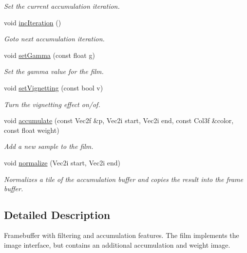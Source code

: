 \begin{DoxyCompactItemize}
\begin{DoxyCompactList}\small\item\em Set the current accumulation iteration. \item\end{DoxyCompactList}\item 
void \hyperlink{classembree_1_1_film_a5b056c860759fa84a4b3db06a9ce2bcb}{incIteration} ()
\begin{DoxyCompactList}\small\item\em Goto next accumulation iteration. \item\end{DoxyCompactList}\item 
void \hyperlink{classembree_1_1_film_ad720f149d57528b344b83f73f6da8008}{setGamma} (const float g)
\begin{DoxyCompactList}\small\item\em Set the gamma value for the film. \item\end{DoxyCompactList}\item 
void \hyperlink{classembree_1_1_film_ad374b405b07336cc9fd325729aab817a}{setVignetting} (const bool v)
\begin{DoxyCompactList}\small\item\em Turn the vignetting effect on/of. \item\end{DoxyCompactList}\item 
void \hyperlink{classembree_1_1_film_a780366147a5ef1e674ab4628db8e8e11}{accumulate} (const Vec2f \&p, Vec2i start, Vec2i end, const Col3f \&color, const float weight)
\begin{DoxyCompactList}\small\item\em Add a new sample to the film. \item\end{DoxyCompactList}\item 
void \hyperlink{classembree_1_1_film_a3c9e1fc94e813fc8f11bacad02b00a96}{normalize} (Vec2i start, Vec2i end)
\begin{DoxyCompactList}\small\item\em Normalizes a tile of the accumulation buffer and copies the result into the frame buffer. \item\end{DoxyCompactList}\end{DoxyCompactItemize}


\subsection{Detailed Description}
Framebuffer with filtering and accumulation features. The film implements the image interface, but contains an additional accumulation and weight image. 

